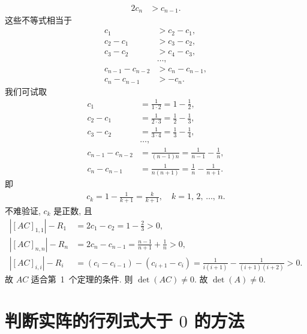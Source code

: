 \documentclass[../libro.tex]{subfiles}
\begin{document}
\begin{example}
\begin{align*}
        2c_n     & > c_{n-1}.
    \end{align*}
    这些不等式相当于
    \begin{align*}
        c_1               & > c_2 - c_1,     \\
        c_2 - c_1         & > c_3 - c_2,     \\
        c_3 - c_2         & > c_4 - c_3,     \\
        & \dots, \\
        c_{n-1} - c_{n-2} & > c_n - c_{n-1}, \\
        c_n - c_{n-1}     & > -c_n.
    \end{align*}
    我们可试取
    \begin{align*}
        c_1 &
        = \frac{1}{1 \cdot 2}
        = 1 - \frac{1}{2}, \\
        c_2 - c_1 &
        = \frac{1}{2 \cdot 3}
        = \frac{1}{2} - \frac{1}{3}, \\
        c_3 - c_2 &
        = \frac{1}{3 \cdot 4}
        = \frac{1}{3} - \frac{1}{4}, \\
        & \dots, \\
        c_{n-1} - c_{n-2} &
        = \frac{1}{(n-1)n}
        = \frac{1}{n-1} - \frac{1}{n}, \\
        c_n - c_{n-1} &
        = \frac{1}{n(n+1)}
        = \frac{1}{n} - \frac{1}{n+1}.
    \end{align*}
    即
    \begin{align*}
        c_k = 1 - \frac{1}{k+1} = \frac{k}{k+1},
        \quad
        \text{\(k = 1\), \(2\), \(\dots\), \(n\)}.
    \end{align*}
    不难验证, \(c_k\) 是正数, 且
    \begin{align*}
        |[AC]_{1,1}| - R_1
        & = 2c_1 - c_2
        = 1 - \frac{2}{3} > 0, \\
        |[AC]_{n,n}| - R_n
        & = 2c_n - c_{n-1}
        = \frac{n-1}{n+1} + \frac{1}{n} > 0, \\
        |[AC]_{i,i}| - R_i
        & = (c_i - c_{i-1}) - (c_{i+1} - c_i)
        = \frac{1}{i(i+1)} - \frac{1}{(i+1)(i+2)} > 0.
    \end{align*}
    故 \(AC\) 适合第~1~个定理的条件.
    则 \(\det {(AC)} \neq 0\).
    故 \(\det {(A)} \neq 0\).
\end{example}

\section{\texorpdfstring{判断实阵的行列式大于 \(0\) 的方法}%
{判断实阵的行列式大于 0 的方法}}
\end{document}

